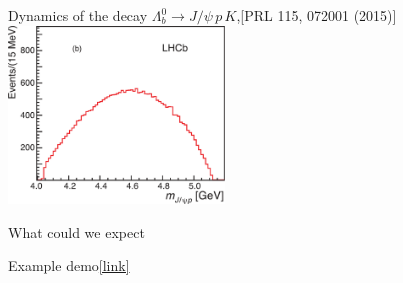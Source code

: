 \documentclass[aspectratio=169]{beamer}
\begin{document}
\begin{frame}{Dynamics of the decay $\Lambda_b^0\to J/\psi\,p\,K$,\hfill \scriptsize[PRL 115, 072001 (2015)]}{}
{\includegraphics[width=0.43\textwidth]{figs/PcOld/mjpsip-phsp_phase_space.pdf}}
\end{frame}

\begin{frame}{What could we expect}
    \begin{center}
        \Huge Example demo\quad\href{https://hub.gke.mybinder.org/user/mmikhasenko-201-rons-manchester-f5b9ueb0/apps/Examples/pentaquark_dalitzplot.ipynb}{\color{orange}[link]}\\[1cm]
        \qquad
    \end{center}
\end{frame}
\end{document}
